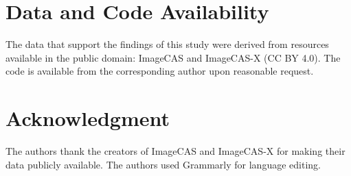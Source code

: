 \documentclass[journal,twoside,web]{ieeecolor}
\begin{document}
\section*{Data and Code Availability}
The data that support the findings of this study were derived from resources available in the public domain: ImageCAS \cite{zeng2023} and ImageCAS-X \cite{imagecasx_data} (CC BY 4.0). The code is available from the corresponding author upon reasonable request.

\section*{Acknowledgment}
The authors thank the creators of ImageCAS and ImageCAS-X for making their data publicly available. The authors
used Grammarly for language editing.



\end{document}

